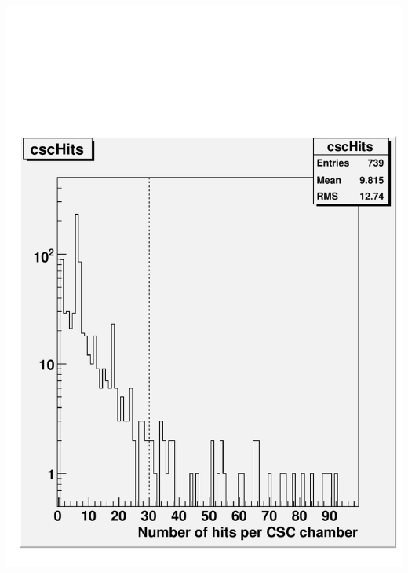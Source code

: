 \documentclass[compress]{beamer}
\begin{document}
\begin{frame}
\begin{columns}
\includegraphics[width=\linewidth]{cscHits.pdf}
\end{columns}

\end{frame}
\end{document}
